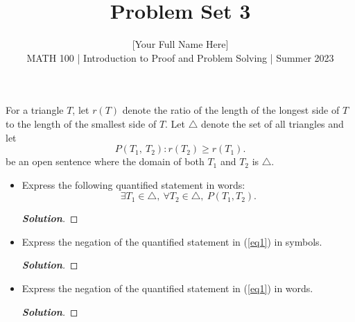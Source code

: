 \documentclass[11pt]{article}
\newenvironment{problem}[2][Problem\!]{\begin{trivlist}
\item[\hskip \labelsep {\bfseries #1}\hskip \labelsep {\bfseries #2.}]}{\end{trivlist}}
\newenvironment{solution}{\begin{proof}[\textbf{\textit{Solution}}]}{\end{proof}}
\renewcommand{\geq}{\geqslant}
\begin{document}
 
\title{Problem Set 3}
\author{[Your Full Name Here]\\[0.5em]
MATH 100 | Introduction to Proof and Problem Solving | Summer 2023}
\date{} 
\maketitle


\begin{problem}{3.1}
For a triangle $T$, let $r(T)$ denote the ratio of the length of the longest side of $T$ to the length of the smallest side of $T$. Let $\triangle$ denote the set of all triangles and let
\[P(T_1,\ T_2): r(T_2) \geq r(T_1).\]
be an open sentence where the domain of both $T_1$ and $T_2$ is $\triangle$.
\begin{itemize}[itemsep=3em]
\item[(a)] Express the following quantified statement in words:
\begin{equation}\label{eq1}
\exists T_1 \in \triangle,\ \forall T_2 \in \triangle,\ P(T_1, T_2).\tag{$*$}
\end{equation}
\begin{solution}
\end{solution}

\item[(b)] Express the negation of the quantified statement in (\ref{eq1}) in symbols.
\begin{solution}
\end{solution}

\item[(c)] Express the negation of the quantified statement in (\ref{eq1}) in words.
\begin{solution}
\end{solution}

\end{itemize}
\end{problem}

\newpage %
\end{document}
